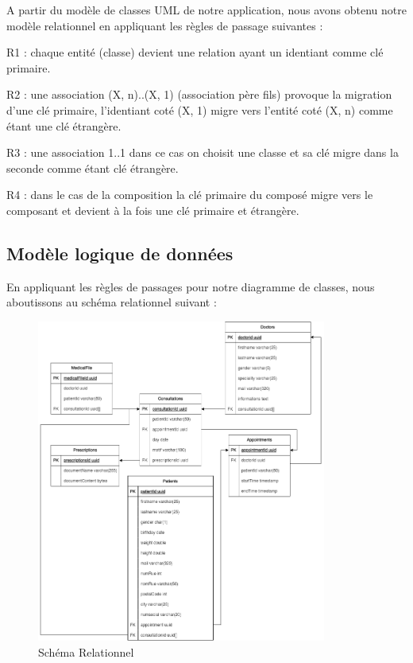 \documentclass[a4paper]{report}
\begin{document}
A partir du modèle de classes UML de notre application, nous avons obtenu notre modèle
relationnel en appliquant les règles de passage suivantes :

R1 : chaque entité (classe) devient une relation ayant un identiant comme clé primaire.

R2 : une association (X, n)..(X, 1) (association père fils) provoque la migration d'une
clé primaire, l'identiant coté (X, 1) migre vers l'entité coté (X, n) comme étant une clé
étrangère.

R3 : une association 1..1 dans ce cas on choisit une classe et sa clé migre dans la seconde
comme étant clé étrangère.

R4 : dans le cas de la composition la clé primaire du composé migre vers le composant
et devient à la fois une clé primaire et étrangère.


\subsection{Modèle logique de données}
En appliquant les règles de passages pour notre diagramme de classes, nous
aboutissons au schéma relationnel suivant :
\begin{figure}[H]
    \vspace{-10pt}
    \centering
    \includegraphics[width=0.85\textwidth]{besoins/modele_relationnel.png}
    \caption{Schéma Relationnel}
    \label{fig:SR}
\end{figure}
\end{document}
